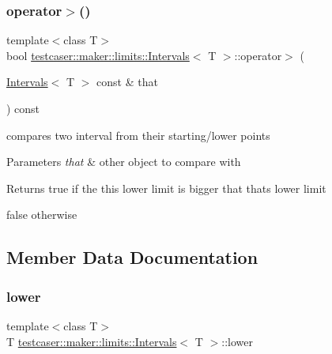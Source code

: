 \subsubsection{\texorpdfstring{operator$>$()}{operator>()}}
{\footnotesize\ttfamily template$<$class T$>$ \\
bool \mbox{\hyperlink{structtestcaser_1_1maker_1_1limits_1_1Intervals}{testcaser\+::maker\+::limits\+::\+Intervals}}$<$ T $>$\+::operator$>$ (\begin{DoxyParamCaption}\item[{\mbox{\hyperlink{structtestcaser_1_1maker_1_1limits_1_1Intervals}{Intervals}}$<$ T $>$ const \&}]{that }\end{DoxyParamCaption}) const\hspace{0.3cm}{\ttfamily [inline]}}



compares two interval from their starting/lower points 


\begin{DoxyParams}{Parameters}
{\em that} & other object to compare with \\
\hline
\end{DoxyParams}
\begin{DoxyReturn}{Returns}
true if the this lower limit is bigger that that\textquotesingle{}s lower limit 

false otherwise 
\end{DoxyReturn}


\subsection{Member Data Documentation}
\mbox{\label{structtestcaser_1_1maker_1_1limits_1_1Intervals_a51f277024599c24b6bfdffe1276f236d}} 
\subsubsection{\texorpdfstring{lower}{lower}}
{\footnotesize\ttfamily template$<$class T$>$ \\
T \mbox{\hyperlink{structtestcaser_1_1maker_1_1limits_1_1Intervals}{testcaser\+::maker\+::limits\+::\+Intervals}}$<$ T $>$\+::lower}



